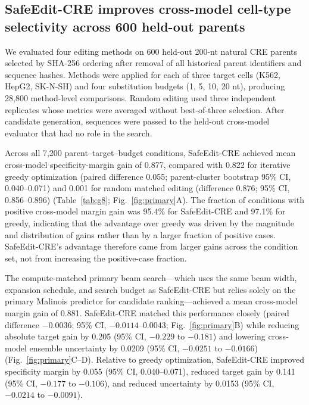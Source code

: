 \subsection{SafeEdit-CRE improves cross-model cell-type selectivity across 600 held-out parents}

We evaluated four editing methods on 600 held-out 200-nt natural CRE parents selected
by SHA-256 ordering after removal of all historical parent identifiers and sequence
hashes. Methods were applied for each of three target cells (K562, HepG2, SK-N-SH) and
four substitution budgets (1, 5, 10, 20 nt), producing 28,800 method-level comparisons.
Random editing used three independent replicates whose metrics were averaged without
best-of-three selection. After candidate generation, sequences were passed to the
held-out cross-model evaluator that had no role in the search.

Across all 7,200 parent--target--budget conditions, SafeEdit-CRE achieved mean
cross-model specificity-margin gain of 0.877, compared with 0.822 for iterative greedy
optimization (paired difference 0.055; parent-cluster bootstrap 95\% CI,
0.040--0.071) and 0.001 for random matched editing (difference 0.876; 95\% CI,
0.856--0.896) (Table~\ref{tab:g8}; Fig.~\ref{fig:primary}A). The fraction of
conditions with positive cross-model margin gain was 95.4\% for SafeEdit-CRE and
97.1\% for greedy, indicating that the advantage over greedy was driven by the
magnitude and distribution of gains rather than by a larger fraction of positive
cases. SafeEdit-CRE's advantage therefore came from larger gains across the
condition set, not from increasing the positive-case fraction.

The compute-matched primary beam search---which uses the same beam width, expansion
schedule, and search budget as SafeEdit-CRE but relies solely on the primary Malinois
predictor for candidate ranking---achieved a mean cross-model margin gain of 0.881.
SafeEdit-CRE matched this performance closely (paired difference $-0.0036$; 95\% CI,
$-0.0114$--0.0043; Fig.~\ref{fig:primary}B) while reducing absolute target gain by
0.205 (95\% CI, $-0.229$ to $-0.181$) and lowering cross-model ensemble uncertainty
by 0.0209 (95\% CI, $-0.0251$ to $-0.0166$) (Fig.~\ref{fig:primary}C--D). Relative to
greedy optimization, SafeEdit-CRE improved specificity margin by 0.055 (95\% CI,
0.040--0.071), reduced target gain by 0.141 (95\% CI, $-0.177$ to $-0.106$), and
reduced uncertainty by 0.0153 (95\% CI, $-0.0214$ to $-0.0091$).

